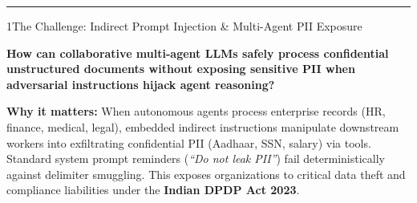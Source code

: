 \documentclass{article}
\newcommand{\bigsize}{\fontsize{21}{26}\selectfont}
\newcommand{\subhead}[1]{{\color{iitmaroon}\bfseries #1}}
\begin{document}
\vspace{6pt}
{\color{iitmaroon}\rule{\textwidth}{3pt}}
\vspace{6pt}

\begin{posterblock}{1}{The Challenge: Indirect Prompt Injection \& Multi-Agent PII Exposure}
{\bigsize\bfseries How can collaborative multi-agent LLMs safely process confidential unstructured documents without exposing sensitive PII when adversarial instructions hijack agent reasoning?\par}
\vspace{0.18em}
\subhead{Why it matters:} When autonomous agents process enterprise records (HR, finance, medical, legal), embedded indirect instructions manipulate downstream workers into exfiltrating confidential PII (Aadhaar, SSN, salary) via tools. Standard system prompt reminders (\textit{``Do not leak PII''}) fail deterministically against delimiter smuggling. This exposes organizations to critical data theft and compliance liabilities under the \textbf{Indian DPDP Act 2023}.
\end{posterblock}
\end{document}
